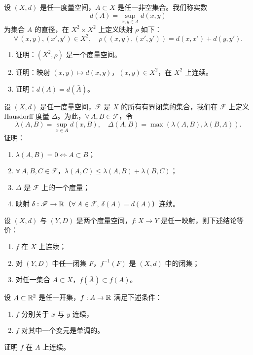 \begin{exercise}
	\item 设 $(X,d)$ 是任一度量空间，$A\subset X$ 是任一非空集合。我们称实数
	\[d(A)=\sup_{x,y\in A}d(x,y)\]
	为集合 $A$ 的直径，在 $X^2\times X^2$ 上定义映射 $\rho$ 如下：
	\[\forall\,(x,y),(x',y')\in X^2,\quad\rho((x,y),(x',y'))=d(x,x')+d(y,y').\]
	\begin{enumerate}[label=\arabic*)]
		\item 证明：$(X^2,\rho)$ 是一个度量空间。
		\item 证明：映射 $(x,y)\mapsto d(x,y)$，$(x,y)\in X^2$，在 $X^2$ 上连续。
		\item 证明：$d(A)=d(\bar A)$。
	\end{enumerate}
\end{exercise}

\begin{exercise}
	\item 设 $(X,d)$ 是任一度量空间，$\mathscr{F}$ 是 $X$ 的所有有界闭集的集合，我们在 $\mathscr{F}$ 上定义 Hausdorff 度量 $\Delta$。为此，$\forall\,A,B\in\mathscr{F}$，令
	\[\lambda(A,B)=\sup_{x\in A}d(x,B),\quad\Delta(A,B)=\max(\lambda(A,B),\lambda(B,A)).\]
	证明：
	\begin{enumerate}[label=\arabic*)]
		\item $\lambda(A,B)=0\Longleftrightarrow A\subset B$；
		\item $\forall\,A,B,C\in\mathscr{F}$，$\lambda(A,C)\leqslant\lambda(A,B)+\lambda(B,C)$；
		\item $\Delta$ 是 $\mathscr{F}$ 上的一个度量；
		\item 映射 $\delta:\mathscr{F}\to\mathbb{R}$（$\forall\,A\in\mathscr{F},\ \delta(A)=d(A)$）连续。
	\end{enumerate}
\end{exercise}

\begin{exercise}
	\item 设 $(X,d)$ 与 $(Y,D)$ 是两个度量空间，$f:X\to Y$ 是任一映射，则下述结论等价：
	\begin{enumerate}[label=\arabic*)]
		\item $f$ 在 $X$ 上连续；
		\item 对 $(Y,D)$ 中任一闭集 $F$，$f^{-1}(F)$ 是 $(X,d)$ 中的闭集；
		\item 对任一集合 $A\subset X$，$f(\bar A)\subset\overline{f(A)}$。
	\end{enumerate}
\end{exercise}

\begin{exercise}
	\item 设 $A\subset\mathbb{R}^2$ 是任一开集，$f:A\to\mathbb{R}$ 满足下述条件：
	\begin{enumerate}[label=\arabic*)]
		\item $f$ 分别关于 $x$ 与 $y$ 连续，
		\item $f$ 对其中一个变元是单调的。
	\end{enumerate}
	证明 $f$ 在 $A$ 上连续。
\end{exercise}

